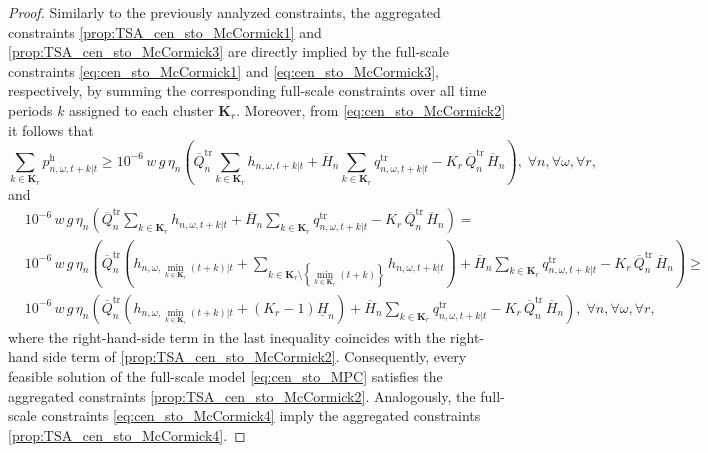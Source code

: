 \documentclass[10pt,a4paper]{amsart}
\begin{document}
\begin{proof}
Similarly to the previously analyzed constraints, the aggregated constraints 
\eqref{prop:TSA_cen_sto_McCormick1} and \eqref{prop:TSA_cen_sto_McCormick3}
are directly implied by the full-scale constraints
\eqref{eq:cen_sto_McCormick1} and \eqref{eq:cen_sto_McCormick3},
respectively, by summing the corresponding full-scale constraints over all time periods $k$ assigned to each cluster $\boldsymbol{K}_r$.
Moreover, from \eqref{eq:cen_sto_McCormick2} it follows that
\begin{equation}
\sum_{k \in \boldsymbol{K}_r} p^{\mathrm{h}}_{n, \omega, t+k|t}
\geq
10^{-6} \, w \, g \, \eta_n
\left(
\overline{Q}^{\mathrm{tr}}_{n} \sum_{k \in \boldsymbol{K}_r} h_{n, \omega, t+k|t} +
\overline{H}_{n} \sum_{k \in \boldsymbol{K}_r} q^{\mathrm{tr}}_{n, \omega, t+k|t} -
K_r \, \overline{Q}^{\mathrm{tr}}_{n} \, \overline{H}_{n}\right),
\; \forall n, \forall \omega, \forall r,
\end{equation}
and
\begin{align*}
& 10^{-6} \, w \, g \, \eta_n
\left(
\overline{Q}^{\mathrm{tr}}_{n} \sum_{k \in \boldsymbol{K}_r} h_{n, \omega, t+k|t} +
\overline{H}_{n} \sum_{k \in \boldsymbol{K}_r} q^{\mathrm{tr}}_{n, \omega, t+k|t} -
K_r \, \overline{Q}^{\mathrm{tr}}_{n} \, \overline{H}_{n}
\right)
= \\
& 10^{-6} \, w \, g \, \eta_n
\left(
\overline{Q}^{\mathrm{tr}}_{n} \left(h_{n, \omega, \min_{k \in \boldsymbol{K}_r}(t+k)|t} + \sum_{k \in \boldsymbol{K}_r \setminus \left\{\min_{k \in \boldsymbol{K}_r}(t+k)\right\}} h_{n, \omega, t+k|t}\right) +
\overline{H}_{n} \sum_{k \in \boldsymbol{K}_r} q^{\mathrm{tr}}_{n, \omega, t+k|t} -
K_r \, \overline{Q}^{\mathrm{tr}}_{n} \, \overline{H}_{n}
\right)
\geq\\
& 10^{-6} \, w \, g \, \eta_n
\left(
\overline{Q}^{\mathrm{tr}}_{n} \left(h_{n, \omega, \min_{k \in \boldsymbol{K}_r}(t+k)|t} + \left(K_r - 1\right) \underline{H}_n\right) +
\overline{H}_{n} \sum_{k \in \boldsymbol{K}_r} q^{\mathrm{tr}}_{n, \omega, t+k|t} -
K_r \, \overline{Q}^{\mathrm{tr}}_{n} \, \overline{H}_{n}
\right),
\; \forall n, \forall \omega, \forall r,
\end{align*}
where the right-hand-side term in the last inequality coincides with the right-hand side term of \eqref{prop:TSA_cen_sto_McCormick2}.
Consequently, every feasible solution of the full-scale model \eqref{eq:cen_sto_MPC} satisfies the aggregated constraints \eqref{prop:TSA_cen_sto_McCormick2}.
Analogously, the full-scale constraints \eqref{eq:cen_sto_McCormick4} imply the aggregated constraints \eqref{prop:TSA_cen_sto_McCormick4}.


\end{proof}
\end{document}
